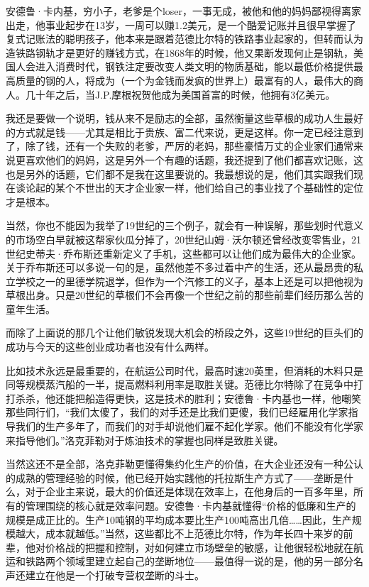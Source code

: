 安德鲁·卡内基，穷小子，老爹是个loser，一事无成，被他和他的妈妈鄙视得离家出走，他事业起步在13岁，一周可以赚1.2美元，是一个酷爱记账并且很早掌握了复式记账法的聪明孩子，他本来是跟着范德比尔特的铁路事业起家的，但转而认为造铁路钢轨才是更好的赚钱方式，在1868年的时候，他又果断发现何止是钢轨，美国人会进入消费时代，钢铁注定要改变人类文明的物质基础，能以最低价格提供最高质量的钢的人，将成为（一个为金钱而发疯的世界上）最富有的人，最伟大的商人。几十年之后，当J.P.摩根祝贺他成为美国首富的时候，他拥有3亿美元。

我还是要做一个说明，钱从来不是励志的全部，虽然衡量这些草根的成功人生最好的方式就是钱------尤其是相比于贵族、富二代来说，更是这样。你一定已经注意到了，除了钱，还有一个失败的老爹，严厉的老妈，那些豪情万丈的企业家们通常来说更喜欢他们的妈妈，这是另外一个有趣的话题，我还提到了他们都喜欢记账，这也是另外的话题，它们都不是我在这里要说的。我最想说的是，他们其实跟我们现在谈论起的某个不世出的天才企业家一样，他们给自己的事业找了个基础性的定位才是根本。

当然，你也不能因为我举了19世纪的三个例子，就会有一种误解，那些划时代意义的市场空白早就被这帮家伙瓜分掉了，20世纪山姆·沃尔顿还曾经改变零售业，21世纪史蒂夫·乔布斯还重新定义了手机，这些都可以让他们成为最伟大的企业家。关于乔布斯还可以多说一句的是，虽然他差不多过着中产的生活，还从最昂贵的私立学校之一的里德学院退学，但作为一个汽修工的义子，基本上还是可以把他视为草根出身。只是20世纪的草根们不会再像一个世纪之前的那些前辈们经历那么苦的童年生活。

而除了上面说的那几个让他们敏锐发现大机会的桥段之外，这些19世纪的巨头们的成功与今天的这些创业成功者也没有什么两样。

比如技术永远是最重要的，在航运公司时代，最高时速20英里，但消耗的木料只是同等规模蒸汽船的一半，提高燃料利用率是取胜关键。范德比尔特除了在竞争中打打杀杀，他还能把船造得更快，这是技术的胜利；安德鲁·卡内基也一样，他嘲笑那些同行们，``我们太傻了，我们的对手还是比我们更傻，我们已经雇用化学家指导我们的生产多年了，而我们的对手却说他们雇不起化学家。他们不能没有化学家来指导他们。''洛克菲勒对于炼油技术的掌握也同样是致胜关键。

当然这还不是全部，洛克菲勒更懂得集约化生产的价值，在大企业还没有一种公认的成熟的管理经验的时候，他已经开始实践他的托拉斯生产方式了------垄断是什么，对于企业主来说，最大的价值还是体现在效率上，在他身后的一百多年里，所有的管理围绕的核心就是效率问题。安德鲁·卡内基就懂得``价格的低廉和生产的规模是成正比的。生产10吨钢的平均成本要比生产100吨高出几倍\ldots\ldots 因此，生产规模越大，成本就越低。''当然，这些都比不上范德比尔特，作为年长四十来岁的前辈，他对价格战的把握和控制，对如何建立市场壁垒的敏感，让他很轻松地就在航运和铁路两个领域里建立起自己的垄断地位------最值得一说的是，他的另一部分名声还建立在他是一个打破专营权垄断的斗士。

